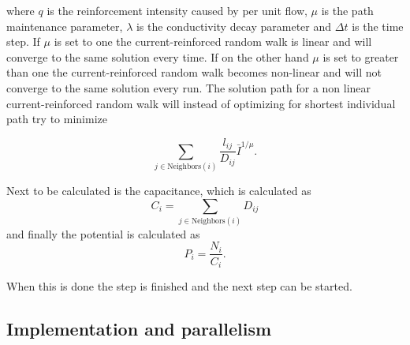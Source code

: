 where $q$ is the reinforcement intensity caused by per unit flow, $\mu$ is the path maintenance parameter, $\lambda$ is the conductivity decay parameter and $\Delta t$ is the time step. If $\mu$ is set to one the current-reinforced random walk is linear and will converge to the same solution every time. If on the other hand $\mu$ is set to greater than one the current-reinforced random walk becomes non-linear and will not converge to the same solution every run. The solution path for a non linear current-reinforced random walk will instead of optimizing for shortest individual path try to minimize

\begin{equation}
\sum_{j \in \text{Neighbors}(i)}\frac{l_{ij}}{D_{ij}}\bar{I}^{1/\mu}.
\end{equation}
 

Next to be calculated is the capacitance, which is calculated as 
 \begin{equation}
 C_i = \sum_{j \in \text{Neighbors}(i)} D_{ij}
 \end{equation}
 and finally the potential is calculated as
 \begin{equation}
 P_i = \frac{N_i}{C_i}.
 \end{equation}
 
 \noindent When this is done the step is finished and the next step can be started.
 
 \subsection{Implementation and parallelism}